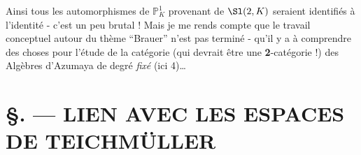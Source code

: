 Ainsi tous les automorphismes de $\mathbb{P}^1_K$ provenant de $\Sl (2, K)$ seraient identifiés à l'identité - c'est un peu brutal ! Mais je me rends compte que le travail conceptuel autour du thème ``Brauer'' n'est pas terminé - qu'il y a à comprendre des choses pour l'étude de la catégorie (qui devrait être une {\bf 2}-catégorie !) des Algèbres d'Azumaya de degré \emph{fixé} (ici 4)\dots 




















\chapter*{\S {}. --- LIEN AVEC LES ESPACES DE TEICHMÜLLER}\thispagestyle{empty}
\label{sec:21}
\section*{}

